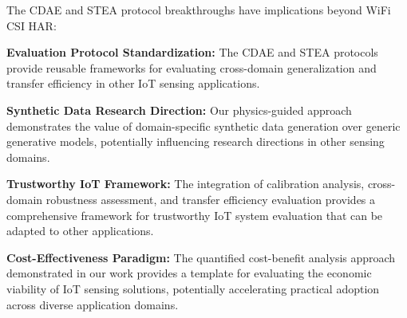 The CDAE and STEA protocol breakthroughs have implications beyond WiFi CSI HAR:

\textbf{Evaluation Protocol Standardization:} The CDAE and STEA protocols provide reusable frameworks for evaluating cross-domain generalization and transfer efficiency in other IoT sensing applications.

\textbf{Synthetic Data Research Direction:} Our physics-guided approach demonstrates the value of domain-specific synthetic data generation over generic generative models, potentially influencing research directions in other sensing domains.

\textbf{Trustworthy IoT Framework:} The integration of calibration analysis, cross-domain robustness assessment, and transfer efficiency evaluation provides a comprehensive framework for trustworthy IoT system evaluation that can be adapted to other applications.

\textbf{Cost-Effectiveness Paradigm:} The quantified cost-benefit analysis approach demonstrated in our work provides a template for evaluating the economic viability of IoT sensing solutions, potentially accelerating practical adoption across diverse application domains.